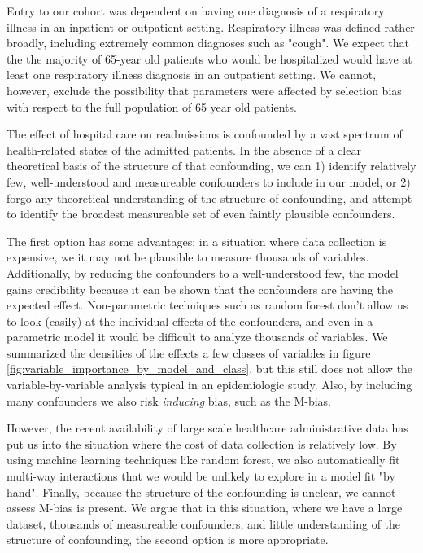 \documentclass[]{article}\usepackage[]{graphicx}\usepackage[]{color}
\begin{document}
Entry to our cohort was dependent on having one diagnosis of a respiratory illness in an inpatient or outpatient setting. Respiratory illness was defined rather broadly, including extremely common diagnoses such as "cough". We expect that the the majority of 65-year old patients who would be hospitalized would have at least one respiratory illness diagnosis in an outpatient setting. We cannot, however, exclude the possibility that parameters were affected by selection bias with respect to the full population of 65 year old patients.

The effect of hospital care on readmissions is confounded by a vast spectrum of health-related states of the admitted patients. In the absence of a clear theoretical basis of the structure of that confounding, we can 1) identify relatively few, well-understood and measureable confounders to include in our model, or 2) forgo any theoretical understanding of the structure of confounding, and attempt to identify the broadest measureable set of even faintly plausible confounders.

The first option has some advantages: in a situation where data collection is expensive, we it may not be plausible to measure thousands of variables. Additionally, by reducing the confounders to a well-understood few, the model gains credibility because it can be shown that the confounders are having the expected effect. Non-parametric techniques such as random forest don't allow us to look (easily) at the individual effects of the confounders, and even in a parametric model it would be difficult to analyze thousands of variables. We summarized the densities of the effects a few classes of variables in figure \ref{fig:variable_importance_by_model_and_class}, but this still does not allow the variable-by-variable analysis typical in an epidemiologic study. Also, by including many confounders we also risk \emph{inducing} bias, such as the M-bias.

However, the recent availability of large scale healthcare administrative data has put us into the situation where the cost of data collection is relatively low. By using machine learning techniques like random forest, we also automatically fit multi-way interactions that we would be unlikely to explore in a model fit "by hand". Finally, because the structure of the confounding is unclear, we cannot assess M-bias is present. We argue that in this situation, where we have a large dataset, thousands of measureable confounders, and little understanding of the structure of confounding, the second option is more appropriate.
\end{document}
